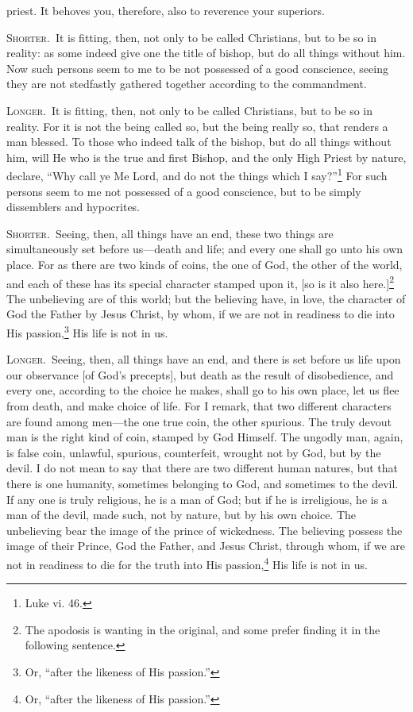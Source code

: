 priest. It behoves you, therefore, also to reverence your superiors.


\textsc{Shorter.}~It is fitting, then, not only to be called Christians, but to be so in reality: as some indeed give one the title of bishop, but do all things without him. Now such persons seem to me to be not possessed of a good conscience, seeing they are not stedfastly gathered together according to the commandment.

\textsc{Longer.}~It is fitting, then, not only to be called Christians, but to be so in reality. For it is not the being called so, but the being really so, that renders a man blessed. To those who indeed talk of the bishop, but do all things without him, will He who is the true and first Bishop, and the only High Priest by nature, declare, “Why call ye Me Lord, and do not the things which I say?”\footnote{Luke vi. 46.} For such persons seem to me not possessed of a good conscience, but to be simply dissemblers and hypocrites.


\textsc{Shorter.}~Seeing, then, all things have an end, these two things are simultaneously set before us—death and life; and every one shall go unto his own place. For as there are two kinds of coins, the one of God, the other of the world, and each of these has its special character stamped upon it, [so is it also here.]\footnote{The apodosis is wanting in the original, and some prefer finding it in the following sentence.} The unbelieving are of this world; but the believing have, in love, the character of God the Father by Jesus Christ, by whom, if we are not in readiness to die into His passion,\footnote{Or, “after the likeness of His passion.”} His life is not in us.

\textsc{Longer.}~Seeing, then, all things have an end, and there is set before us life upon our observance [of God’s precepts], but death as the result of disobedience, and every one, according to the choice he makes, shall go to his own place, let us flee from death, and make choice of life. For I remark, that two different characters are found among men—the one true coin, the other spurious. The truly devout man is the right kind of coin, stamped by God Himself. The ungodly man, again, is false coin, unlawful, spurious, counterfeit, wrought not by God, but by the devil. I do not mean to say that there are two different human natures, but that there is one humanity, sometimes belonging to God, and sometimes to the devil. If any one is truly religious, he is a man of God; but if he is irreligious, he is a man of the devil, made such, not by nature, but by his own choice. The unbelieving bear the image of the prince of wickedness. The believing possess the image of their Prince, God the Father, and Jesus Christ, through whom, if we are not in readiness to die for the truth into His passion,\footnote{Or, “after the likeness of His passion.”} His life is not in us.

